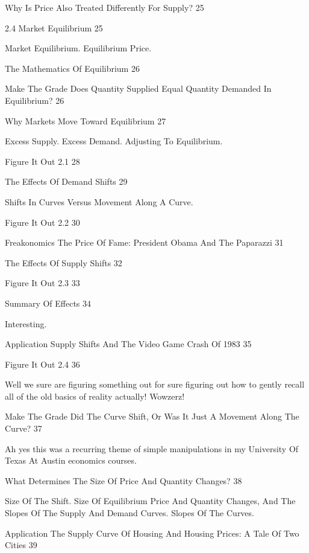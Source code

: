 Why Is Price Also Treated Differently For Supply? 25



2.4 Market Equilibrium 25

Market Equilibrium. Equilibrium Price.

The Mathematics Of Equilibrium 26



Make The Grade Does Quantity Supplied Equal Quantity Demanded In Equilibrium? 26



Why Markets Move Toward Equilibrium 27

Excess Supply. Excess Demand. Adjusting To Equilibrium.

Figure It Out 2.1 28



The Effects Of Demand Shifts 29

Shifts In Curves Versus Movement Along A Curve.

Figure It Out 2.2 30



Freakonomics The Price Of Fame: President Obama And The Paparazzi 31



The Effects Of Supply Shifts 32



Figure It Out 2.3 33



Summary Of Effects 34

Interesting.

Application Supply Shifts And The Video Game Crash Of 1983 35



Figure It Out 2.4 36

Well we sure are figuring something out for sure figuring out how to gently recall all of the old basics of reality actually! Wowzerz!

Make The Grade Did The Curve Shift, Or Was It Just A Movement Along The Curve? 37

Ah yes this was a recurring theme of simple manipulations in my University Of Texas At Austin economics courses.

What Determines The Size Of Price And Quantity Changes? 38

Size Of The Shift. Size Of Equilibrium Price And Quantity Changes, And The Slopes Of The Supply And Demand Curves. Slopes Of The Curves.

Application The Supply Curve Of Housing And Housing Prices: A Tale Of Two Cities 39

